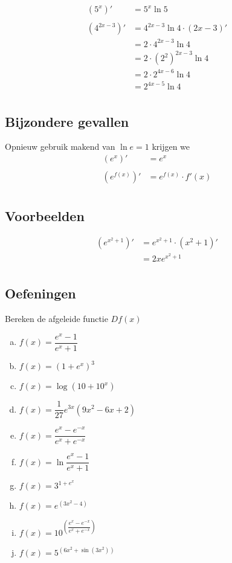 \documentclass[12pt,twoside,a4paper]{article}
\begin{document}
\begin{align*}
\left(5^x\right)'      &= 5^x \ln 5\\\\
\left(4^{2x-3}\right)' &= 4^{2x-3} \ln 4 \cdot (2x-3)'\\
                       &= 2 \cdot 4^{2x-3} \ln 4\\
                       &= 2 \cdot \left(2^2\right)^{2x-3} \ln 4\\
                       &= 2 \cdot 2^{4x-6} \ln 4\\
                       &= 2^{4x-5} \ln 4\\
\end{align*}

\subsection{Bijzondere gevallen}
Opnieuw gebruik makend van $\ln e=1$ krijgen we
\begin{align*}
  \left(e^x\right)'      & = e^x              \\\\
  \left(e^{f(x)}\right)' & = e^{f(x)} \cdot f'(x) \\
\end{align*}

\subsection{Voorbeelden}

\begin{align*}
\left(e^{x^2+1}\right)' & = e^{x^2+1} \cdot (x^2+1)' \\
                        & = 2x e^{x^2+1}         \\
\end{align*}

\subsection{Oefeningen}

\begin{oefening}
Bereken de afgeleide functie $Df(x)$
\begin{multicols}{2}
\begin{enumerate}[(a)]
  \itemsep0.8em
  \item $f(x)=\dfrac{e^x-1}{e^x+1}$
  \item $f(x)=(1+e^x)^3$
  \item $f(x)=\log(10+10^x)$
  \item $f(x)=\dfrac{1}{27}e^{3x}(9x^2-6x+2)$
  \item $f(x)=\dfrac{e^x-e^{-x}}{e^x+e^{-x}}$
  \item $f(x)=\ln\dfrac{e^x-1}{e^x+1}$
  \item $f(x)=3^{1+e^x}$
  \item $f(x)=e^{(3x^2-4)}$
  \item $f(x)=10^{\left(\dfrac{e^x-e^{-x}}{e^x+e^{-x}}\right)}$
  \item $f(x)=5^{\left(6x^2+\sin(3x^2)\right)}$
\end{enumerate}
\end{multicols}
\end{oefening}
\end{document}
